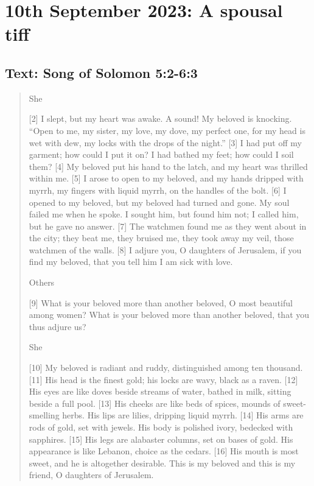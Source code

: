 \setcounter{figure}{0}

\section{10th September 2023: A spousal tiff}
\subsection*{Text: Song of Solomon 5:2-6:3}
  \begin{quote}
    She

    [2] I slept, but my heart was awake.
    A sound! My beloved is knocking.
    “Open to me, my sister, my love,
        my dove, my perfect one,
    for my head is wet with dew,
        my locks with the drops of the night.”
    [3] I had put off my garment;
        how could I put it on?
    I had bathed my feet;
        how could I soil them?
    [4] My beloved put his hand to the latch,
        and my heart was thrilled within me.
    [5] I arose to open to my beloved,
        and my hands dripped with myrrh,
    my fingers with liquid myrrh,
        on the handles of the bolt.
    [6] I opened to my beloved,
        but my beloved had turned and gone.
    My soul failed me when he spoke.
    I sought him, but found him not;
        I called him, but he gave no answer.
    [7] The watchmen found me
        as they went about in the city;
    they beat me, they bruised me,
        they took away my veil,
        those watchmen of the walls.
    [8] I adjure you, O daughters of Jerusalem,
        if you find my beloved,
    that you tell him
        I am sick with love.


    Others

    [9] What is your beloved more than another beloved,
        O most beautiful among women?
    What is your beloved more than another beloved,
        that you thus adjure us?


        She

    [10] My beloved is radiant and ruddy,
        distinguished among ten thousand.
    [11] His head is the finest gold;
        his locks are wavy,
        black as a raven.
    [12] His eyes are like doves
        beside streams of water,
    bathed in milk,
        sitting beside a full pool.
    [13] His cheeks are like beds of spices,
        mounds of sweet-smelling herbs.
    His lips are lilies,
        dripping liquid myrrh.
    [14] His arms are rods of gold,
        set with jewels.
    His body is polished ivory,
        bedecked with sapphires.
    [15] His legs are alabaster columns,
        set on bases of gold.
    His appearance is like Lebanon,
        choice as the cedars.
    [16] His mouth is most sweet,
        and he is altogether desirable.
    This is my beloved and this is my friend,
        O daughters of Jerusalem.



\end{quote}
